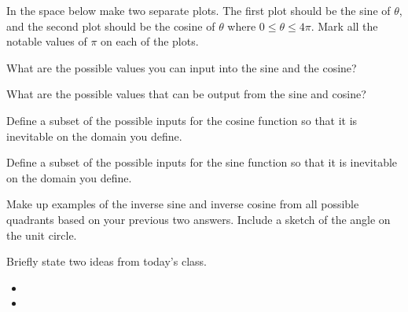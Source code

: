 \begin{problem}
  \clearpage

\item In the space below make two separate plots. The first plot
  should be the sine of $\theta$, and the second plot should be the
  cosine of $\theta$ where $0\leq\theta\leq 4\pi$.  Mark all the
  notable values of $\pi$ on each of the plots.

  \vfill

\item What are the possible values you can input into the sine and the
  cosine?
  \vfill

\item What are the possible values that can be output from the sine
  and cosine?

  \clearpage

\item Define a subset of the possible inputs for the cosine function
  so that it is inevitable on the domain you define.

  \vfill

\item Define a subset of the possible inputs for the sine function
  so that it is inevitable on the domain you define.

  \vfill

\item Make up examples of the inverse sine and inverse cosine from all
  possible quadrants based on your previous two answers. Include a
  sketch of the angle on the unit circle.

  \vfill

\end{problem}

\postClass

\begin{problem}
\item Briefly state two ideas from today's class.
  \begin{itemize}
  \item 
  \item 
  \end{itemize}
\item 
  \begin{subproblem}
    \item
  \end{subproblem}
\end{problem}



